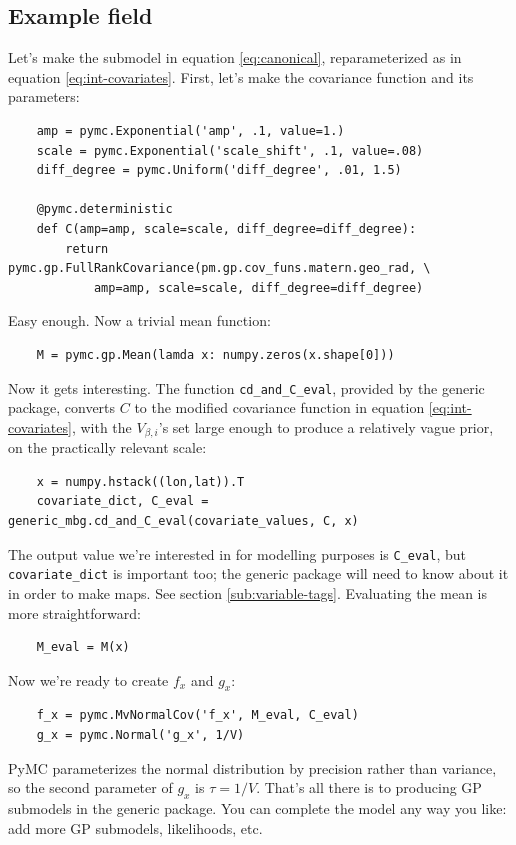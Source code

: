 \subsection{Example field}
\label{sub:example} 

Let's make the submodel in equation \ref{eq:canonical}, reparameterized as in equation \ref{eq:int-covariates}. First, let's make the covariance function and its parameters:
\begin{verbatim}
    amp = pymc.Exponential('amp', .1, value=1.)
    scale = pymc.Exponential('scale_shift', .1, value=.08)
    diff_degree = pymc.Uniform('diff_degree', .01, 1.5)
    
    @pymc.deterministic
    def C(amp=amp, scale=scale, diff_degree=diff_degree):
        return pymc.gp.FullRankCovariance(pm.gp.cov_funs.matern.geo_rad, \
            amp=amp, scale=scale, diff_degree=diff_degree)
\end{verbatim}
Easy enough. Now a trivial mean function:
\begin{verbatim}
    M = pymc.gp.Mean(lamda x: numpy.zeros(x.shape[0]))
\end{verbatim}

Now it gets interesting. The function \texttt{cd\_and\_C\_eval}, provided by the generic package, converts $C$ to the modified covariance function in equation \ref{eq:int-covariates}, with the $V_{\beta,i}$'s set large enough to produce a relatively vague prior, on the practically relevant scale:
\begin{verbatim}
    x = numpy.hstack((lon,lat)).T
    covariate_dict, C_eval = generic_mbg.cd_and_C_eval(covariate_values, C, x)
\end{verbatim}
The output value we're interested in for modelling purposes is \texttt{C\_eval}, but \texttt{covariate\_dict} is important too; the generic package will need to know about it in order to make maps. See section \ref{sub:variable-tags}. Evaluating the mean is more straightforward:
\begin{verbatim}
    M_eval = M(x)
\end{verbatim} 

Now we're ready to create $f_x$ and $g_x$:
\begin{verbatim}
    f_x = pymc.MvNormalCov('f_x', M_eval, C_eval)
    g_x = pymc.Normal('g_x', 1/V)
\end{verbatim}
PyMC parameterizes the normal distribution by precision rather than variance, so the second parameter of $g_x$ is $\tau=1/V$. That's all there is to producing GP submodels in the generic package. You can complete the model any way you like: add more GP submodels, likelihoods, etc.


